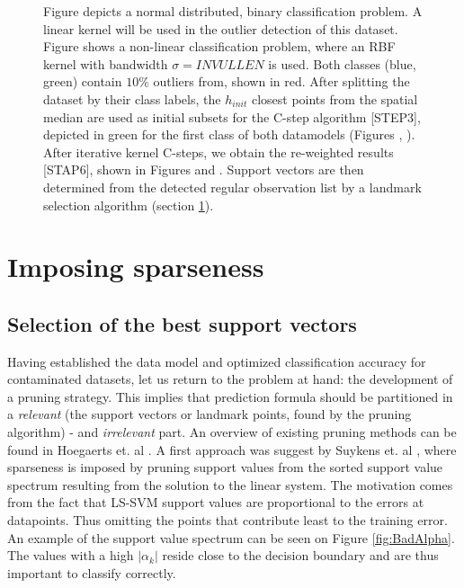 \documentclass[preprint,12pt]{elsarticle}
\begin{document}
\begin{figure}[!htb]
{			Figure  depicts a normal distributed, binary classification problem. A linear kernel will be used in the outlier detection of this dataset. Figure  shows a non-linear classification problem, where an RBF kernel with bandwidth $\sigma = INVULLEN$ is used.  Both classes (blue, green) contain $10\%$ outliers from, shown in red. After splitting the dataset by their class labels, the $h_ {init}$ closest points from the spatial median are used as initial subsets for the C-step algorithm [STEP3], depicted in green for the first class of both datamodels (Figures , ). After iterative kernel C-steps, we obtain the re-weighted results  [STAP6], shown in Figures  and . Support vectors are then determined from the detected regular observation list by a landmark selection algorithm (section \ref{sec:Sparseness}).}
		\label{fig:C-step}
	\end{figure}
	
	
	
	\newpage
	\FloatBarrier
	
	\section{Imposing sparseness}
	\label{sec:Sparseness}
	
	\subsection{Selection of the best support vectors}
	
	Having established the data model and optimized classification accuracy for contaminated datasets, let us return to the problem at hand: the development of a pruning strategy. This implies that prediction formula should be partitioned in a \textit{relevant} (the support vectors or landmark points, found by the pruning algorithm) - and \textit{irrelevant} part.  An overview of existing pruning methods can be found in Hoegaerts et. al \cite{hoegaerts2004comparison}. A first approach was suggest by Suykens et. al \cite{suykens2000sparse}, where  sparseness is imposed by pruning support values from the sorted support value spectrum resulting from the solution to the linear system.  The motivation comes from the fact that LS-SVM support values are proportional to the errors at datapoints. Thus omitting the points that contribute least to the training error. An example of the support value spectrum can be seen on Figure \ref{fig:BadAlpha}. The values with a high $|\alpha_k|$ reside close to the decision boundary and are thus important to classify correctly. 
	
\end{document}
